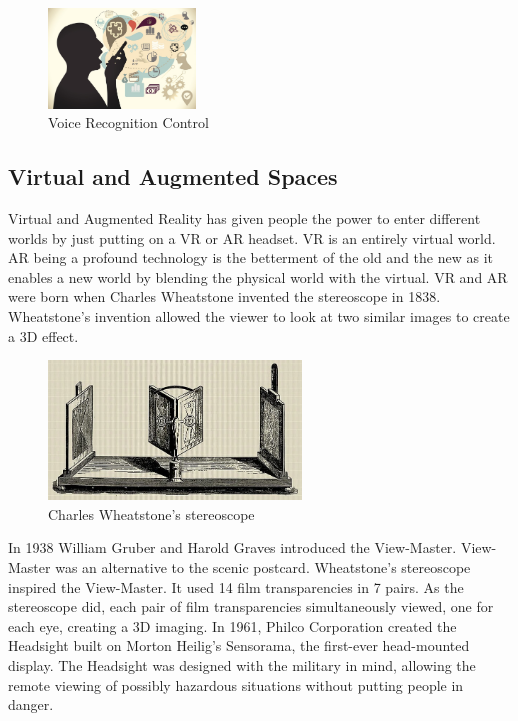 \documentclass{article}
\begin{document}
\begin{figure}[!ht]
    \caption{Voice Recognition Control}
    \label{image:VRC}
    \centering
    \includegraphics[width=0.35\textwidth]{pics/vrc.jpg}
\end{figure}

\subsection{Virtual and Augmented Spaces}
Virtual and Augmented Reality has given people the power to enter different worlds by just putting on a VR or AR headset. VR is an entirely virtual world. AR being a profound technology is the betterment of the old and the new as it enables a new world by blending the physical world with the virtual. VR and AR were born when Charles Wheatstone invented the stereoscope in 1838. Wheatstone’s invention allowed the viewer to look at two similar images to create a 3D effect.
\cite{ref11}

\begin{figure}[!ht]
    \caption{Charles Wheatstone’s stereoscope}
    \label{image:stereoscope}
    \centering
    \includegraphics[width=0.6\textwidth]{pics/stereoscope.jpg}
\end{figure}

In 1938 William Gruber and Harold Graves introduced the View-Master.  View-Master was an alternative to the scenic postcard. Wheatstone’s stereoscope inspired the View-Master. It used 14 film transparencies in 7 pairs. As the stereoscope did, each pair of film transparencies simultaneously viewed, one for each eye, creating a 3D imaging. In 1961, Philco Corporation created the Headsight built on Morton Heilig's Sensorama, the first-ever head-mounted display. The Headsight was designed with the military in mind, allowing the remote viewing of possibly hazardous situations without putting people in danger.
\cite{ref11}
\end{document}
